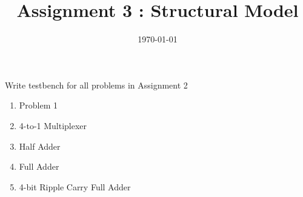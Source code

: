 \documentclass{vhdl-assignment}
\title{Assignment 3 : Structural Model}
\date{\today}
\begin{document}
\maketitle

\begin{problem}{Write testbench for all problems in Assignment 2}
    \begin{enumerate}
        \item Problem 1
        \item 4-to-1 Multiplexer
        \item Half Adder
        \item Full Adder
        \item 4-bit Ripple Carry Full Adder
    \end{enumerate}
\end{problem}
\end{document}
